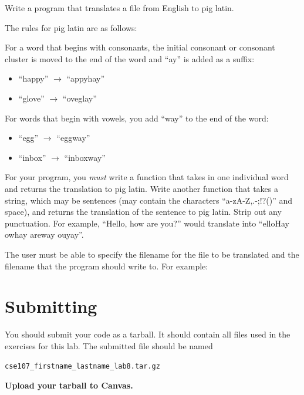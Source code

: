 \documentclass[11pt]{cselabheader}
\begin{document}
\begin{ex}[piglatin.py] Write a program that translates a file from English to
  pig latin.

  The rules for pig latin are as follows:

  For a word that begins with consonants, the initial consonant or
  consonant cluster is moved to the end of the word and ``ay'' is added as a
  suffix:
  \begin{multicols}{2}
  \begin{itemize}
    \item ``happy'' $\to$ ``appyhay''
    \item ``glove'' $\to$ ``oveglay''
  \end{itemize}
  \end{multicols}

  For words that begin with vowels, you add ``way'' to the end of the word:
  \begin{multicols}{2}
  \begin{itemize}
    \item ``egg'' $\to$ ``eggway''
    \item ``inbox'' $\to$ ``inboxway''
  \end{itemize}
  \end{multicols}

  For your program, you \emph{must} write a function that takes in one
  individual word and returns the translation to pig latin. Write another
  function that takes a string, which may be sentences (may contain the
  characters ``a-zA-Z,.-;!?()'' and space), and returns the translation of the
  sentence to pig latin. Strip out any punctuation. For example, ``Hello, how
  are you?'' would translate into ``elloHay owhay areway ouyay''.

  The user must be able to specify the filename for the file to be translated
  and the filename that the program should write to. For example:

\end{ex}

\pagebreak
\section{Submitting}
You should submit your code as a tarball. It should contain all files
used in the exercises for this lab. The submitted file should be named
\begin{center}
  \texttt{cse107\_firstname\_lastname\_lab8.tar.gz}
\end{center}

\begin{center}
  \textbf{Upload your tarball to Canvas.}
\end{center}

\listofexercises
\end{document}
